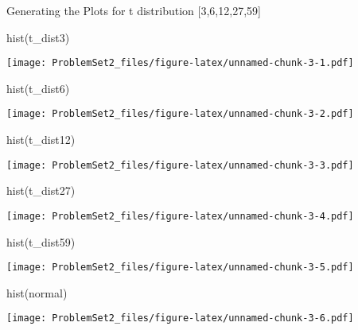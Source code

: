 \documentclass[
]{article}
\newenvironment{Shaded}{\begin{snugshade}}{\end{snugshade}}
\newcommand{\FunctionTok}[1]{\textcolor[rgb]{0.00,0.00,0.00}{#1}}
\newcommand{\NormalTok}[1]{#1}
\begin{document}
Generating the Plots for t distribution {[}3,6,12,27,59{]}

\begin{Shaded}
\begin{Highlighting}[]
\FunctionTok{hist}\NormalTok{(t\_dist3)}
\end{Highlighting}
\end{Shaded}

\texttt{[image: ProblemSet2\_files/figure-latex/unnamed-chunk-3-1.pdf]}

\begin{Shaded}
\begin{Highlighting}[]
\FunctionTok{hist}\NormalTok{(t\_dist6)}
\end{Highlighting}
\end{Shaded}

\texttt{[image: ProblemSet2\_files/figure-latex/unnamed-chunk-3-2.pdf]}

\begin{Shaded}
\begin{Highlighting}[]
\FunctionTok{hist}\NormalTok{(t\_dist12)}
\end{Highlighting}
\end{Shaded}

\texttt{[image: ProblemSet2\_files/figure-latex/unnamed-chunk-3-3.pdf]}

\begin{Shaded}
\begin{Highlighting}[]
\FunctionTok{hist}\NormalTok{(t\_dist27)}
\end{Highlighting}
\end{Shaded}

\texttt{[image: ProblemSet2\_files/figure-latex/unnamed-chunk-3-4.pdf]}

\begin{Shaded}
\begin{Highlighting}[]
\FunctionTok{hist}\NormalTok{(t\_dist59)}
\end{Highlighting}
\end{Shaded}

\texttt{[image: ProblemSet2\_files/figure-latex/unnamed-chunk-3-5.pdf]}

\begin{Shaded}
\begin{Highlighting}[]
\FunctionTok{hist}\NormalTok{(normal)}
\end{Highlighting}
\end{Shaded}

\texttt{[image: ProblemSet2\_files/figure-latex/unnamed-chunk-3-6.pdf]}
\end{document}
